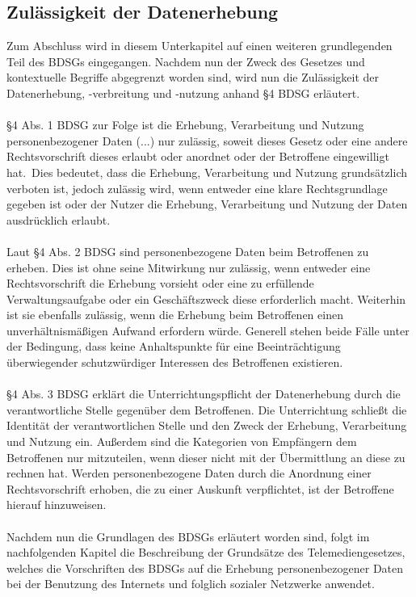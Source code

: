 \subsection{Zulässigkeit der Datenerhebung}
Zum Abschluss wird in diesem Unterkapitel auf einen weiteren grundlegenden Teil des BDSGs eingegangen. Nachdem nun der Zweck des Gesetzes und kontextuelle Begriffe abgegrenzt worden sind, wird nun die Zulässigkeit der Datenerhebung, -verbreitung und -nutzung anhand \S 4 BDSG erläutert.\\
\\\S 4 Abs. 1 BDSG zur Folge ist die \glqq Erhebung, Verarbeitung und Nutzung personenbezogener Daten (...) nur zulässig, soweit dieses Gesetz oder eine andere Rechtsvorschrift dieses erlaubt oder anordnet oder der Betroffene eingewilligt hat.\grqq \ Dies bedeutet, dass die Erhebung, Verarbeitung und Nutzung grundsätzlich verboten ist, jedoch zulässig wird, wenn entweder eine klare Rechtsgrundlage gegeben ist oder der Nutzer die Erhebung, Verarbeitung und Nutzung der Daten ausdrücklich erlaubt.\\
\\Laut \S 4 Abs. 2 BDSG sind personenbezogene Daten beim Betroffenen zu erheben. Dies ist ohne seine Mitwirkung nur zulässig, wenn entweder eine Rechtsvorschrift die Erhebung vorsieht oder eine zu erfüllende Verwaltungsaufgabe oder ein Geschäftszweck diese erforderlich macht. Weiterhin ist sie ebenfalls zulässig, wenn \glqq die Erhebung beim Betroffenen einen unverhältnismäßigen Aufwand erfordern würde\grqq. Generell stehen beide Fälle unter der Bedingung, dass keine Anhaltspunkte für eine Beeinträchtigung überwiegender schutzwürdiger Interessen des Betroffenen existieren.\\
\\\S 4 Abs. 3 BDSG erklärt die Unterrichtungspflicht der Datenerhebung durch die verantwortliche Stelle gegenüber dem Betroffenen. Die Unterrichtung schließt die Identität der verantwortlichen Stelle und den Zweck der Erhebung, Verarbeitung und Nutzung ein. Außerdem sind die Kategorien von Empfängern dem Betroffenen nur mitzuteilen, wenn dieser nicht mit der Übermittlung an diese zu rechnen hat. Werden personenbezogene Daten durch die Anordnung einer Rechtsvorschrift erhoben, die zu einer Auskunft verpflichtet, ist der Betroffene hierauf hinzuweisen.\\
\\Nachdem nun die Grundlagen des BDSGs erläutert worden sind, folgt im nachfolgenden Kapitel die Beschreibung der Grundsätze des Telemediengesetzes, welches die Vorschriften des BDSGs auf die Erhebung personenbezogener Daten bei der Benutzung des Internets und folglich sozialer Netzwerke anwendet.